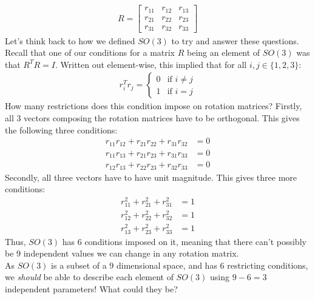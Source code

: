 \documentclass[oneside]{book}
\begin{document}
\begin{align}
    R =
    \begin{bmatrix}
    r_{11} & r_{12} & r_{13} \\
    r_{21}  & r_{22}  & r_{23} \\
    r_{31}  & r_{32}  & r_{33} 
    \end{bmatrix}
\end{align}
Let's think back to how we defined $SO(3)$ to try and answer these questions. Recall that one of our conditions for a matrix $R$ being an element of $SO(3)$ was that $R^TR = I$. Written out element-wise, this implied that for all $i, j \in \{1, 2, 3\}$:
\begin{align}
    r_i^Tr_j = \begin{cases}
        0 & \text{if } i \neq j\\
        1 & \text{if } i = j
    \end{cases}
\end{align}
How many restrictions does this condition impose on rotation matrices? Firstly, all 3 vectors composing the rotation matrices have to be orthogonal. This gives the following three conditions:
\begin{align}
    r_{11}r_{12} + r_{21}r_{22} + r_{31}r_{32} &= 0\\
    r_{11}r_{13} + r_{21}r_{23} + r_{31}r_{33} &= 0\\
    r_{12}r_{13} + r_{22}r_{23} + r_{32}r_{33} &= 0
\end{align}
Secondly, all three vectors have to have unit magnitude. This gives three more conditions:
\begin{align}
    r_{11}^2 + r_{21}^2 + r_{31}^2 &= 1\\
    r_{12}^2 + r_{22}^2 + r_{32}^2 &= 1\\
    r_{13}^2 + r_{23}^2 + r_{33}^2 &= 1
\end{align}
Thus, $SO(3)$ has $6$ conditions imposed on it, meaning that there can't possibly be 9 independent values we can change in any rotation matrix. \\
As $SO(3)$ is a subset of a 9 dimensional space, and has 6 restricting conditions, we \textit{should} be able to describe each element of $SO(3)$ using $9-6 = 3$ independent parameters! What could they be?
\end{document}
